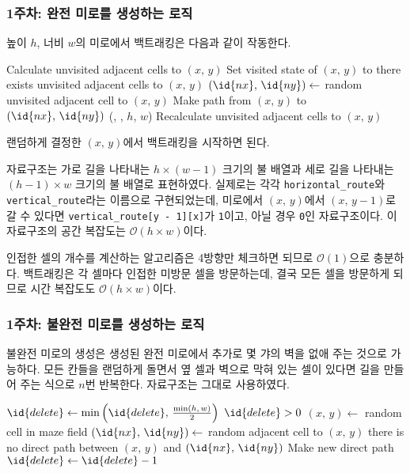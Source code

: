 \subsubsection{1주차: 완전 미로를 생성하는 로직} 높이 $h$, 너비 $w$의 미로에서 백트래킹은 다음과 같이 작동한다.

\begin{codebox}
\li Calculate unvisited adjacent cells to $(x,\,y)$
\li Set visited state of $(x,\,y)$ to 
\li \While there exists unvisited adjacent cells to $(x,\,y)$ \Do
\li     $(\id{nx},\,\id{ny}) \gets$ random unvisited adjacent cell to $(x,\,y)$
\li     Make path from $(x,\,y)$ to $(\id{nx},\,\id{ny})$
\li     {}(, , $h$, $w$)
\li     Recalculate unvisited adjacent cells to $(x,\,y)$
    \End
\end{codebox}

랜덤하게 결정한 $(x,\,y)$에서 백트래킹을 시작하면 된다.

자료구조는 가로 길을 나타내는 $h \times \left(w - 1\right)$ 크기의 불 배열과 세로 길을 나타내는 $\left(h - 1\right) \times w$ 크기의
불 배열로 표현하였다. 실제로는 각각 \texttt{horizontal_route}와 \texttt{vertical_route}라는 이름으로 구현되었는데,
미로에서 $(x,\,y)$에서 $(x,\,y-1)$로 갈 수 있다면 \texttt{vertical_route[y - 1][x]}가 \texttt{1}이고, 아닐 경우 \texttt{0}인 자료구조이다.
이 자료구조의 공간 복잡도는 $\mathcal{O}\left(h\times w\right)$이다.

인접한 셀의 개수를 계산하는 알고리즘은 4방향만 체크하면 되므로 $\mathcal{O}\left(1\right)$으로 충분하다.
백트래킹은 각 셀마다 인접한 미방문 셀을 방문하는데, 결국 모든 셀을 방문하게 되므로 시간 복잡도도 $\mathcal{O}\left(h\times w\right)$이다.

\subsubsection{1주차: 불완전 미로를 생성하는 로직} 불완전 미로의 생성은 생성된 완전 미로에서 추가로 몇 갸의 벽을 없애 주는 것으로 가능하다.
모든 칸들을 랜덤하게 돌면서 옆 셀과 벽으로 막혀 있는 셀이 있다면 길을 만들어 주는 식으로 $n$번 반복한다. 자료구조는 그대로 사용하였다.

\begin{codebox}
\li $\id{delete} \gets \min\left(\id{delete},\,\frac{\min\left(h,\,w\right)}{2}\right)$
\li \While $\id{delete} > 0$ \Do
\li     $(x,\,y) \gets$ random cell in maze field
\li     $(\id{nx},\,\id{ny}) \gets$ random adjacent cell to $(x,\,y)$
\li     \If there is no direct path between $(x,\,y)$ and $(\id{nx},\,\id{ny})$ \Then
\li         Make new direct path
\li         $\id{delete} \gets \id{delete} - 1$
        \End
    \End
\end{codebox}

